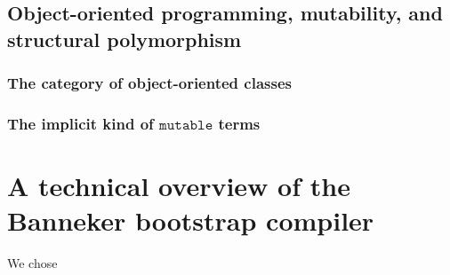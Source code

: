\documentclass{amsbook}
\DeclareRobustCommand{\#}{\adjustbox{valign=B,totalheight=.57\baselineskip}{\oldhash}}%
\theoremstyle{definition}
\theoremstyle{remark}
\numberwithin{section}{chapter}
\numberwithin{equation}{chapter}
\begin{document}
\section{Object-oriented programming, mutability, and structural polymorphism}

\subsection{The category of object-oriented classes}

\subsection{The implicit kind of $\texttt{mutable}$ terms}

\chapter{A technical overview of the Banneker bootstrap compiler}

We chose 

\appendix
% 

\backmatter


\printindex
\end{document}

